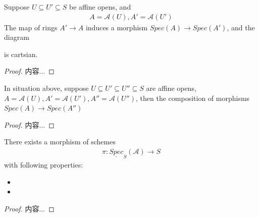\documentclass[Total.tex]{subfiles}
\begin{document}
				\begin{lemma}
					Suppose $U\subseteq U'\subseteq S$ be affine opens, and
					\begin{gather*}
						A=\mathcal{A}(U),A'=\mathcal{A}(U')
					\end{gather*}
					The map of rings $A'\rightarrow A$ induces a morphism $Spec(A)\rightarrow Spec(A')$, and the diagram
					\begin{center}
					\end{center}
					is cartsian.
				\end{lemma}
				\begin{proof}
					内容...
				\end{proof}
				\begin{lemma}
					In situation above, suppose $U\subseteq U'\subseteq U''\subseteq S$ are affine opens, $A=\mathcal{A}(U),A'=\mathcal{A}(U'),A''=\mathcal{A}(U'')$, then the composition of morphisms $Spec(A)\rightarrow Spec(A'')$
				\end{lemma}
				\begin{proof}
					内容...
				\end{proof}
				\begin{lemma}
					There exists a morphism of schemes
					\begin{gather*}
						\pi:\underline{Spec}_S(\mathcal{A})\rightarrow S
					\end{gather*}
					with following properties:
					\begin{itemize}
						\item 
						\item 
					\end{itemize}
				\end{lemma}
				\begin{proof}
					内容...
				\end{proof}
\end{document}
